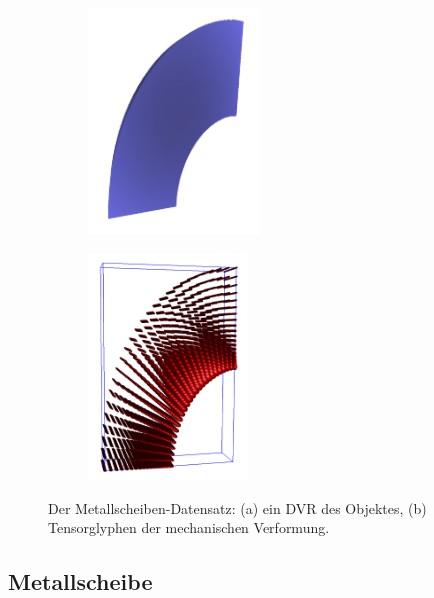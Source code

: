 \documentclass[a4paper,fontsize=12pt,toc=bib,parskip=half,ngerman]{scrartcl}
\begin{document}
\begin{figure}
	\hspace*{\fill}
	\begin{subfigure}{0.49\textwidth}
		\centering
		\includegraphics[height=6cm]{pictures/results/MetalDisk/MetalDisk_Object.png}
		\subcaption{}
		\label{MetalDiskObject}
	\end{subfigure}
	\begin{subfigure}{0.49\textwidth}
		\centering
		\includegraphics[height=6cm]{pictures/results/MetalDisk/strain/MetalDisk_Strain_Ellipsoids.png}
		\subcaption{}
		\label{MetalDiskStrainEllipsoids}
	\end{subfigure}
	\hspace*{\fill}
	\caption{Der Metallscheiben-Datensatz: (a) ein DVR des Objektes, (b) Tensorglyphen der mechanischen Verformung.}
	\label{MetalDisk}
\end{figure}

\subsection{Metallscheibe}
\end{document}
